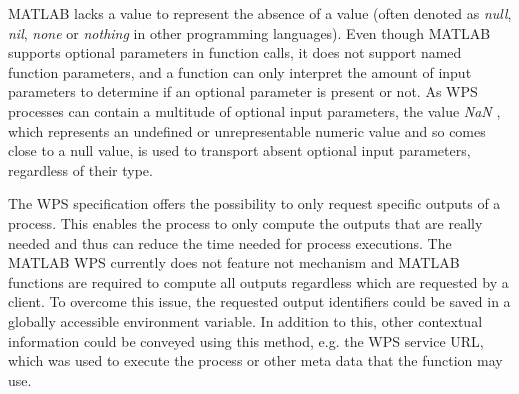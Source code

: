 		MATLAB lacks a value to represent the absence of a value (often denoted as \emph{null}, \emph{nil}, \emph{none} or \emph{nothing} in other programming languages). Even though MATLAB supports optional parameters in function calls, it does not support named function parameters, and a function can only interpret the amount of input parameters to determine if an optional parameter is present or not. As WPS processes can contain a multitude of optional input parameters, the value \emph{NaN} \citep{ieee:754:2008}, which represents an undefined or unrepresentable numeric value and so comes close to a null value, is used to transport absent optional input parameters, regardless of their type.

		The WPS specification offers the possibility to only request specific outputs of a process. This enables the process to only compute the outputs that are really needed and thus can reduce the time needed for process executions. The MATLAB WPS currently does not feature not mechanism and MATLAB functions are required to compute all outputs regardless which are requested by a client.
		To overcome this issue, the requested output identifiers could be saved in a globally accessible environment variable. In addition to this, other contextual information could be conveyed using this method, e.g. the WPS service URL, which was used to execute the process or other meta data that the function may use.


